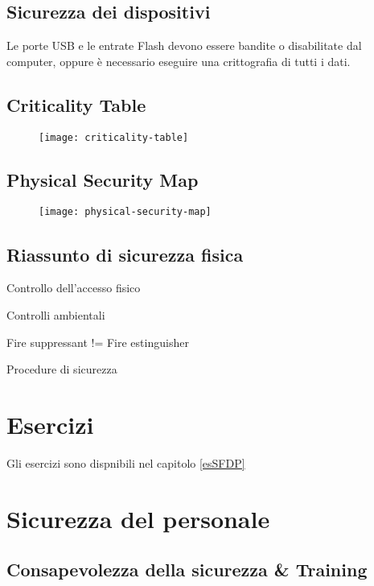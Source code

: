 \subsection{Sicurezza dei dispositivi}

Le porte USB e le entrate Flash devono essere bandite o disabilitate dal 
computer, oppure è necessario eseguire una crittografia di tutti i dati.


\subsection{Criticality Table}

\begin{figure}[H]
 \centering
 \texttt{[image: criticality-table]}
\end{figure}

\subsection{Physical Security Map}
\begin{figure}[H]
 \centering
 \texttt{[image: physical-security-map]}
\end{figure}

\subsection{Riassunto di sicurezza fisica}

Controllo dell'accesso fisico

Controlli ambientali

Fire suppressant != Fire estinguisher

Procedure di sicurezza

\section{Esercizi}

Gli esercizi sono dispnibili nel capitolo \ref{esSFDP}

\section{Sicurezza del personale}

\subsection{Consapevolezza della sicurezza \& Training}

